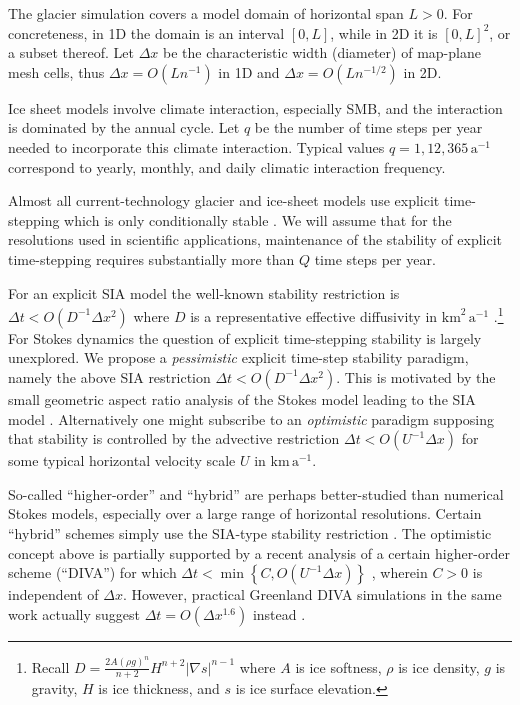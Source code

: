 \documentclass[twocolumn,letterpaper]{igs}
\newcommand{\grad}{\nabla}
\begin{document}
The glacier simulation covers a model domain of horizontal span $L>0$.  For concreteness, in 1D the domain is an interval $[0,L]$, while in 2D it is $[0,L]^2$, or a subset thereof.  Let $\Delta x$ be the characteristic width (diameter) of map-plane mesh cells, thus $\Delta x = O(L n^{-1})$ in 1D and $\Delta x = O(L n^{-1/2})$ in 2D.

Ice sheet models involve climate interaction, especially SMB, and the interaction is dominated by the annual cycle.  Let $q$ be the number of time steps per year needed to incorporate this climate interaction.  Typical values $q=1,12,365 \,\text{a}^{-1}$ correspond to yearly, monthly, and daily climatic interaction frequency.

Almost all current-technology glacier and ice-sheet models use explicit time-stepping which is only conditionally stable \citep{LeVeque2007}.  We will assume that for the resolutions used in scientific applications, maintenance of the stability of explicit time-stepping requires substantially more than $Q$ time steps per year.

For an explicit SIA model the well-known stability restriction is $\Delta t < O(D^{-1} \Delta x^2)$ where $D$ is a representative effective diffusivity in $\text{km}^2\,\text{a}^{-1}$ \citep{Bueleretal2005,HindmarshPayne1996}.\footnote{Recall $\displaystyle D = \frac{2 A (\rho g)^n}{n+2} H^{n+2} |\grad s|^{n-1}$ where $A$ is ice softness, $\rho$ is ice density, $g$ is gravity, $H$ is ice thickness, and $s$ is ice surface elevation.}
For Stokes dynamics the question of explicit time-stepping stability is largely unexplored.  We propose a \emph{pessimistic} explicit time-step stability paradigm, namely the above SIA restriction $\Delta t < O(D^{-1} \Delta x^2)$.  This is motivated by the small geometric aspect ratio analysis of the Stokes model leading to the SIA model \citep{GreveBlatter2009}.  Alternatively one might subscribe to an \emph{optimistic} paradigm supposing that stability is controlled by the advective restriction $\Delta t < O(U^{-1} \Delta x)$ for some typical horizontal velocity scale $U$ in $\text{km}\,\text{a}^{-1}$.

So-called ``higher-order'' and ``hybrid'' are perhaps better-studied than numerical Stokes models, especially over a large range of horizontal resolutions.  Certain ``hybrid'' schemes simply use the SIA-type stability restriction \citep{Winkelmannetal2011}.  The optimistic concept above is partially supported by a recent analysis of a certain higher-order scheme (``DIVA'') for which $\Delta t < \min\left\{C,O(U^{-1} \Delta x)\right\}$ \citep[equations (52) and (56)]{Robinsonetal2022}, wherein $C>0$ is independent of $\Delta x$.  However, practical Greenland DIVA simulations in the same work actually suggest $\Delta t = O(\Delta x^{1.6})$ instead \citep[Figure 3(a)]{Robinsonetal2022}.
\end{document}
